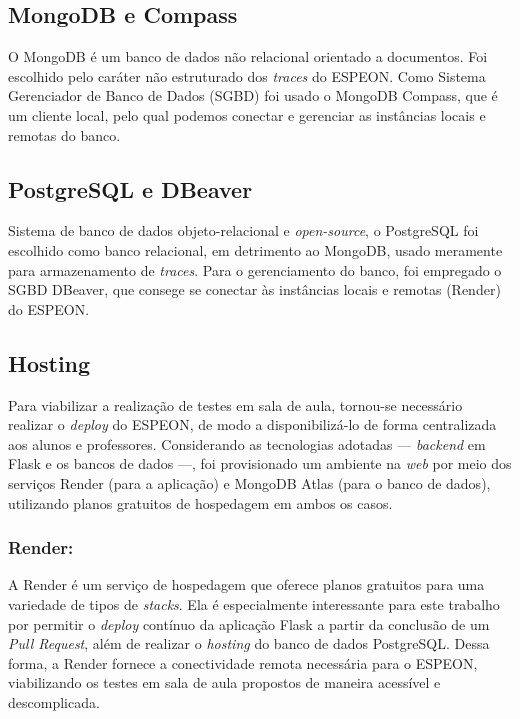\subsection{MongoDB e Compass}\label{sub:tools_mongodb}
O MongoDB é um banco de dados não relacional orientado a documentos. Foi escolhido pelo caráter não estruturado dos \textit{traces} do ESPEON. Como Sistema Gerenciador de Banco de Dados (SGBD) foi usado o MongoDB Compass, que é um cliente local, pelo qual podemos conectar e gerenciar as instâncias locais e remotas do banco.

\subsection{PostgreSQL e DBeaver}\label{sub:tools_postgres}
Sistema de banco de dados objeto-relacional e \textit{open-source}, o PostgreSQL foi escolhido como banco relacional, em detrimento ao MongoDB, usado meramente para armazenamento de \textit{traces}. Para o gerenciamento do banco, foi empregado o SGBD DBeaver, que consege se conectar às instâncias locais e remotas (Render) do ESPEON.

\subsection{Hosting}\label{sub:tools_hosting}
Para viabilizar a realização de testes em sala de aula, tornou-se necessário realizar o \textit{deploy} do ESPEON, de modo a disponibilizá-lo de forma centralizada aos alunos e professores. Considerando as tecnologias adotadas — \textit{backend} em Flask e os bancos de dados —, foi provisionado um ambiente na \textit{web} por meio dos serviços Render (para a aplicação) e MongoDB Atlas (para o banco de dados), utilizando planos gratuitos de hospedagem em ambos os casos.

\subsubsection{Render:}
A Render é um serviço de hospedagem que oferece planos gratuitos para uma variedade de tipos de \textit{stacks}. Ela é especialmente interessante para este trabalho por permitir o \textit{deploy} contínuo da aplicação Flask a partir da conclusão de um \textit{Pull Request}, além de realizar o \textit{hosting} do banco de dados PostgreSQL. Dessa forma, a Render fornece a conectividade remota necessária para o ESPEON, viabilizando os testes em sala de aula propostos de maneira acessível e descomplicada.

